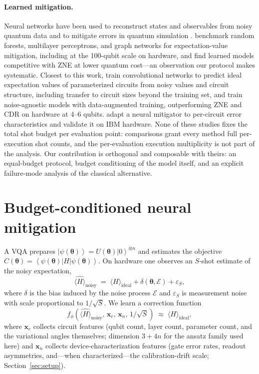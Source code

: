 \documentclass[11pt]{article}
\newcommand{\ket}[1]{\left|#1\right\rangle}
\newcommand{\bra}[1]{\left\langle#1\right|}
\newcommand{\expect}[1]{\langle#1\rangle}
\newcommand{\Hideal}{\expect{H}_{\mathrm{ideal}}}
\begin{document}
\paragraph{Learned mitigation.}
Neural networks have been used to reconstruct states and observables from noisy quantum data \citep{torlai2018neural} and to mitigate errors in quantum simulation \citep{bennewitz2022neural}. \citet{liao2023machine} benchmark random forests, multilayer perceptrons, and graph networks for expectation-value mitigation, including at the 100-qubit scale on hardware, and find learned models competitive with ZNE at lower quantum cost---an observation our protocol makes systematic. Closest to this work, \citet{cantori2024synergy} train convolutional networks to predict ideal expectation values of parameterized circuits from noisy values and circuit structure, including transfer to circuit sizes beyond the training set, and \citet{liao2025noiseagnostic} train noise-agnostic models with data-augmented training, outperforming ZNE and CDR on hardware at 4--6 qubits. \citet{adeniyi2025adaptive} adapt a neural mitigator to per-circuit error characteristics and validate it on IBM hardware. None of these studies fixes the total shot budget per evaluation point: comparisons grant every method full per-execution shot counts, and the per-evaluation execution multiplicity is not part of the analysis. Our contribution is orthogonal and composable with theirs: an equal-budget protocol, budget conditioning of the model itself, and an explicit failure-mode analysis of the classical alternative.

\section{Budget-conditioned neural mitigation}
\label{sec:method}

A VQA prepares $\ket{\psi(\boldsymbol{\theta})}=U(\boldsymbol{\theta})\ket{0}^{\otimes n}$ and estimates the objective $C(\boldsymbol{\theta})=\bra{\psi(\boldsymbol{\theta})}H\ket{\psi(\boldsymbol{\theta})}$. On hardware one observes an $S$-shot estimate of the noisy expectation,
\begin{equation}
\widehat{\expect{H}}_{\mathrm{noisy}} \;=\; \Hideal + \delta(\boldsymbol{\theta},\mathcal{E}) + \varepsilon_S,
\end{equation}
where $\delta$ is the bias induced by the noise process $\mathcal{E}$ and $\varepsilon_S$ is measurement noise with scale proportional to $1/\sqrt{S}$. We learn a correction function
\begin{equation}
f_\phi\!\left(\widehat{\expect{H}}_{\mathrm{noisy}},\, \mathbf{x}_c,\, \mathbf{x}_n,\, 1/\sqrt{S}\right) \;\approx\; \Hideal ,
\label{eq:model}
\end{equation}
where $\mathbf{x}_c$ collects circuit features (qubit count, layer count, parameter count, and the variational angles themselves; dimension $3+4n$ for the ansatz family used here) and $\mathbf{x}_n$ collects device-characterization features (gate error rates, readout asymmetries, and---when characterized---the calibration-drift scale; Section~\ref{sec:setup}).
\end{document}
